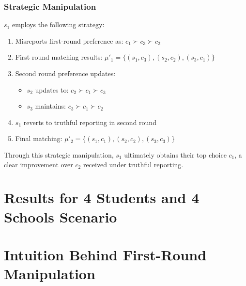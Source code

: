 \documentclass{article}
\begin{document}
\subsubsection{Strategic Manipulation}
$s_1$ employs the following strategy:
\begin{enumerate}
    \item Misreports first-round preference as: $c_1 \succ c_3 \succ c_2$
    \item First round matching results: $\mu'_1 = \{(s_1,c_3), (s_2,c_2), (s_3,c_1)\}$
    \item Second round preference updates:
    \begin{itemize}
        \item $s_2$ updates to: $c_2 \succ c_1 \succ c_3$
        \item $s_3$ maintains: $c_3 \succ c_1 \succ c_2$
    \end{itemize}
    \item $s_1$ reverts to truthful reporting in second round
    \item Final matching: $\mu'_2 = \{(s_1,c_1), (s_2,c_2), (s_3,c_3)\}$
\end{enumerate}
Through this strategic manipulation, $s_1$ ultimately obtains their top choice $c_1$, a clear improvement over $c_2$ received under truthful reporting. 






\section{Results for 4 Students and 4 Schools Scenario}

\section{Intuition Behind First-Round Manipulation}
\end{document}
